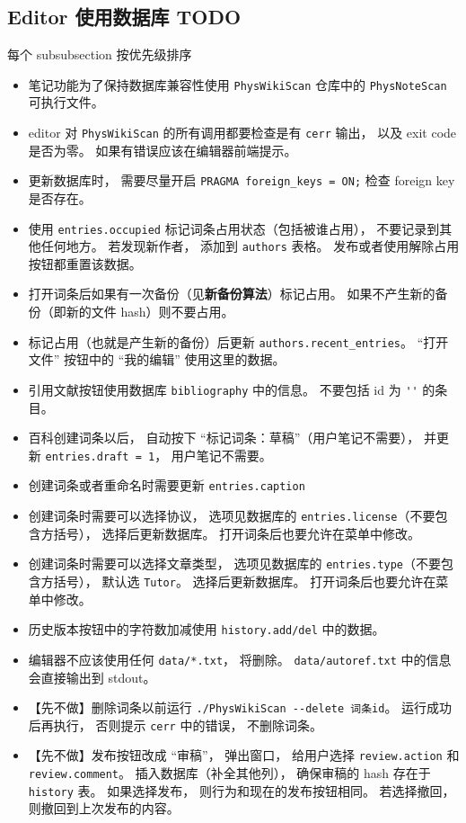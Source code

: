 
\subsection{Editor 使用数据库 TODO}
每个 subsubsection 按优先级排序

\begin{itemize}
\item 笔记功能为了保持数据库兼容性使用 \verb|PhysWikiScan| 仓库中的 \verb|PhysNoteScan| 可执行文件。
\item editor 对 \verb|PhysWikiScan| 的所有调用都要检查是有 \verb|cerr| 输出， 以及 exit code 是否为零。 如果有错误应该在编辑器前端提示。
\item 更新数据库时， 需要尽量开启 \verb|PRAGMA foreign_keys = ON;| 检查 foreign key 是否存在。
\item 使用 \verb|entries.occupied| 标记词条占用状态（包括被谁占用）， 不要记录到其他任何地方。 若发现新作者， 添加到 \verb|authors| 表格。 发布或者使用解除占用按钮都重置该数据。
\item 打开词条后如果有一次备份（见\textbf{新备份算法}）标记占用。 如果不产生新的备份（即新的文件 hash）则不要占用。
\item 标记占用（也就是产生新的备份）后更新 \verb|authors.recent_entries|。 “打开文件” 按钮中的 “我的编辑” 使用这里的数据。
\item 引用文献按钮使用数据库 \verb|bibliography| 中的信息。 不要包括 id 为 \verb|''| 的条目。
\item 百科创建词条以后， 自动按下 “标记词条：草稿”（用户笔记不需要）， 并更新 \verb|entries.draft = 1|， 用户笔记不需要。
\item 创建词条或者重命名时需要更新 \verb|entries.caption|
\item 创建词条时需要可以选择协议， 选项见数据库的 \verb|entries.license|（不要包含方括号）， 选择后更新数据库。 打开词条后也要允许在菜单中修改。
\item 创建词条时需要可以选择文章类型， 选项见数据库的 \verb|entries.type|（不要包含方括号）， 默认选 \verb|Tutor|。 选择后更新数据库。 打开词条后也要允许在菜单中修改。
\item 历史版本按钮中的字符数加减使用 \verb|history.add/del| 中的数据。
\item 编辑器不应该使用任何 \verb|data/*.txt|， 将删除。 \verb|data/autoref.txt| 中的信息会直接输出到 stdout。


\item 【先不做】删除词条以前运行 \verb|./PhysWikiScan --delete 词条id|。 运行成功后再执行， 否则提示 \verb`cerr` 中的错误， 不删除词条。
\item 【先不做】发布按钮改成 “审稿”， 弹出窗口， 给用户选择 \verb|review.action| 和 \verb|review.comment|。 插入数据库（补全其他列）， 确保审稿的 hash 存在于 \verb|history| 表。 如果选择发布， 则行为和现在的发布按钮相同。 若选择撤回， 则撤回到上次发布的内容。
\end{itemize}

